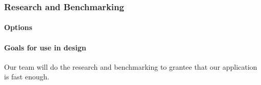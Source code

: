 
\subsubsection{Research and Benchmarking}

\paragraph{Options}

\paragraph{Goals for use in design}

Our team will do the research and benchmarking to grantee that our application is fast enough.

